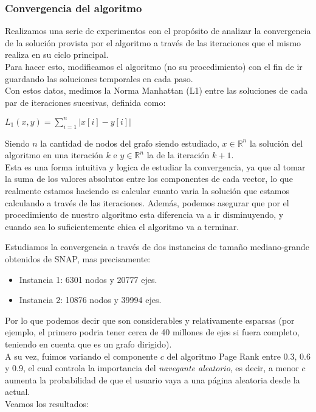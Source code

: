 \subsubsection{Convergencia del algoritmo}

Realizamos una serie de experimentos con el propósito de analizar la convergencia de la solución provista por el algoritmo a través de las iteraciones que el mismo realiza en su ciclo principal.\\
Para hacer esto, modificamos el algoritmo (no su procedimiento) con el fin de ir guardando las soluciones temporales en cada paso.\\
Con estos datos, medimos la Norma Manhattan (L1) entre las soluciones de cada par de iteraciones sucesivas, definida como:

\begin{center}
$L_1(x,y) = \sum\limits_{i=1}^n | x[i] - y[i] | $
\end{center}

Siendo $n$ la cantidad de nodos del grafo siendo estudiado, $x \in \mathbb{R}^{n}$ la solución del algoritmo en una iteración $k$ e $y \in \mathbb{R}^{n}$ la de la iteración $k+1$.\\
Esta es una forma intuitiva y logica de estudiar la convergencia, ya que al tomar la suma de los valores absolutos entre los componentes de cada vector, lo que realmente estamos haciendo es calcular cuanto varia la solución que estamos calculando a través de las iteraciones. Además, podemos asegurar que por el procedimiento de nuestro algoritmo esta diferencia va a ir disminuyendo, y cuando sea lo suficientemente chica el algoritmo va a terminar.

Estudiamos la convergencia a través de dos instancias de tamaño mediano-grande obtenidos de SNAP, mas precisamente:
\begin{itemize}
    \item Instancia 1: 6301 nodos y 20777 ejes.
    \item Instancia 2: 10876 nodos y 39994 ejes.
\end{itemize}
Por lo que podemos decir que son considerables y relativamente esparsas (por ejemplo, el primero podria tener cerca de 40 millones de ejes si fuera completo, teniendo en cuenta que es un grafo dirigido).\\
A su vez, fuimos variando el componente $c$ del algoritmo Page Rank entre 0.3, 0.6 y 0.9, el cual controla la importancia del \textit{navegante aleatorio}, es decir, a menor $c$ aumenta la probabilidad de que el usuario vaya a una página aleatoria desde la actual.\\
Veamos los resultados:

